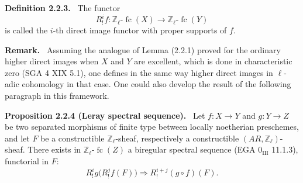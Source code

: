 \documentclass[11pt]{article}
\newenvironment{statement}[1]{\par\medskip\noindent\textbf{#1.}\ }{\par\medskip}
\providecommand{\fc}{\operatorname{fc}}
\begin{document}
\begin{statement}{Definition 2.2.3}
The functor
\[
R^i_!f:\mathbb Z_\ell\text{-}\fc(X)\longrightarrow \mathbb Z_\ell\text{-}\fc(Y)
\]
is called the \(i\)-th direct image functor with proper supports of \(f\).
\end{statement}

\begin{statement}{Remark}
Assuming the analogue of Lemma (2.2.1) proved for the ordinary higher direct images when \(X\) and \(Y\) are excellent, which is done in characteristic zero (SGA 4 XIX 5.1), one defines in the same way higher direct images in \(\ell\)-adic cohomology in that case. One could also develop the result of the following paragraph in this framework.
\end{statement}

\begin{statement}{Proposition 2.2.4 (Leray spectral sequence)}
Let \(f:X\to Y\) and \(g:Y\to Z\) be two separated morphisms of finite type between locally noetherian preschemes, and let \(F\) be a constructible \(\mathbb Z_\ell\)-sheaf, respectively a constructible \((AR,\mathbb Z_\ell)\)-sheaf. There exists in \(\mathbb Z_\ell\text{-}\fc(Z)\) a biregular spectral sequence (EGA \(0_{\mathrm{III}}\) 11.1.3), functorial in \(F\):
\[
R^i_!g\bigl(R^j_!f(F)\bigr)\Longrightarrow R^{i+j}_!(g\circ f)(F).
\]
\end{statement}
\end{document}
